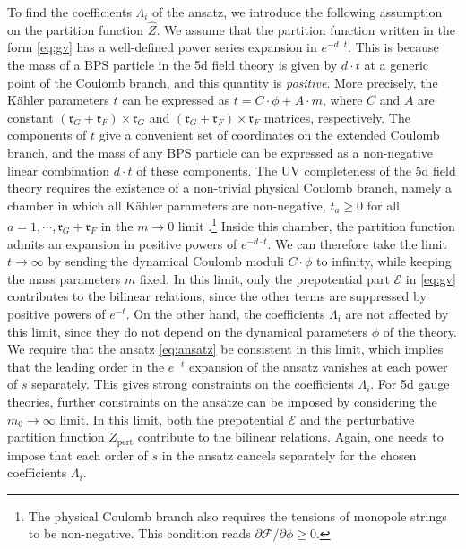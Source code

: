 \documentclass[11pt, a4paper]{article}
\theoremstyle{definition}
\begin{document}
To find the coefficients $ \Lambda_i $ of the ansatz, we introduce the following assumption on the partition function $ \hat{Z} $. We assume that the partition function written in the form \eqref{eq:gv} has a well-defined power series expansion in $ e^{-d \cdot t} $. This is because the mass of a BPS particle in the 5d field theory is given by $ d \cdot t $ at a generic point of the Coulomb branch, and this quantity is \emph{positive}. More precisely, the K\"ahler parameters $ t $ can be expressed as $ t = C\cdot \phi + A \cdot m $, where $ C $ and $ A $ are constant $ (\mathfrak{r}_G+\mathfrak{r}_F)\times \mathfrak{r}_G $ and $ (\mathfrak{r}_G+\mathfrak{r}_F) \times \mathfrak{r}_F $ matrices, respectively. The components of $ t $ give a convenient set of coordinates on the extended Coulomb branch, and the mass of any BPS particle can be expressed as a non-negative linear combination $ d \cdot t $ of these components. The UV completeness of the 5d field theory requires the existence of a non-trivial physical Coulomb branch, namely a chamber in which all K\"ahler parameters are non-negative, $ t_a \geq 0 $ for all $ a=1,\cdots,\mathfrak{r}_G+\mathfrak{r}_F $ in the $ m\to 0 $ limit \cite{Jefferson:2017ahm, Jefferson:2018irk}.\footnote{The physical Coulomb branch also requires the tensions of monopole strings to be non-negative. This condition reads $ \partial \mathcal{F} / \partial \phi \geq 0 $.} Inside this chamber, the partition function admits an expansion in positive powers of $ e^{-d\cdot t} $. We can therefore take the limit $ t\to \infty $ by sending the dynamical Coulomb moduli $ C \cdot \phi $ to infinity, while keeping the mass parameters $ m $ fixed. In this limit, only the prepotential part $ \mathcal{E} $ in \eqref{eq:gv} contributes to the bilinear relations, since the other terms are suppressed by positive powers of $ e^{-t} $. On the other hand, the coefficients $ \Lambda_i $ are not affected by this limit, since they do not depend on the dynamical parameters $ \phi $ of the theory. We require that the ansatz \eqref{eq:ansatz} be consistent in this limit, which implies that the leading order in the $ e^{-t} $ expansion of the ansatz vanishes at each power of $ s $ separately. This gives strong constraints on the coefficients $ \Lambda_i $. For 5d gauge theories, further constraints on the ans\"atze can be imposed by considering the $ m_0 \to \infty $ limit. In this limit, both the prepotential $ \mathcal{E} $ and the perturbative partition function $ Z_{\mathrm{pert}} $ contribute to the bilinear relations. Again, one needs to impose that each order of $ s $ in the ansatz cancels separately for the chosen coefficients $ \Lambda_i $.
\end{document}
